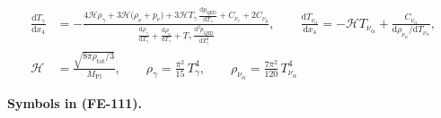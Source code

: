 \documentclass[
  10pt,
]{article}
\begin{document}
\[
\begin{aligned}
\frac{\mathrm{d}T_\gamma}{\mathrm{d}x_4} &= -\frac{4\mathcal{H}\rho_\gamma +
 3\mathcal{H}\big(\rho_{\mathrm{e}} + p_{\mathrm{e}}\big)
 + 3\mathcal{H}T_\gamma\,\frac{\mathrm{d}p_{\mathrm{QED}}}{\mathrm{d}T_\gamma} + C_{\nu_e} + 2C_{\nu_\mu}}
 {\frac{\mathrm{d}\rho_\gamma}{\mathrm{d}T_\gamma} + \frac{\mathrm{d}\rho_{\mathrm{e}}}{\mathrm{d}T_\gamma}
 + T_\gamma\,\frac{\mathrm{d}^2p_{\mathrm{QED}}}{\mathrm{d}T_\gamma^2}},\qquad
 \frac{\mathrm{d}T_{\nu_\alpha}}{\mathrm{d}x_4} = -\mathcal{H}T_{\nu_\alpha} +
 \frac{C_{\nu_\alpha}}{\mathrm{d}\rho_{\nu_\alpha}/\mathrm{d}T_{\nu_\alpha}},\\
\mathcal{H} &= \frac{\sqrt{8\pi\rho_{\mathrm{tot}}/3}}{M_{\mathrm{Pl}}},\qquad \rho_\gamma =
 \frac{\pi^2}{15}\,T_\gamma^4,\qquad
 \rho_{\nu_\alpha} = \frac{7\pi^2}{120}\,T_{\nu_\alpha}^4
\end{aligned} \tag{FE-111}
\]

\textbf{Symbols in (FE-111).}
\end{document}
